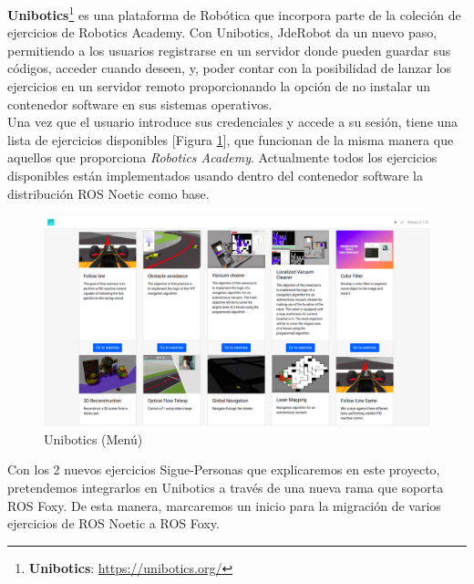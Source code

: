 \textbf{Unibotics}\footnote{\textbf{Unibotics}: \url{https://unibotics.org/}} es una plataforma de Robótica que incorpora parte de la coleción de ejercicios de Robotics Academy. Con Unibotics, JdeRobot da un nuevo paso, permitiendo a los usuarios registrarse en un servidor donde pueden guardar sus códigos, acceder cuando deseen, y, poder contar con la posibilidad de lanzar los ejercicios en un servidor remoto proporcionando la opción de no instalar un contenedor software en sus sistemas operativos.\\

Una vez que el usuario introduce sus credenciales y accede a su sesión, tiene una lista de ejercicios disponibles [Figura \ref{fig:menu-unibotics}], que funcionan de la misma manera que aquellos que proporciona \textit{Robotics Academy}. Actualmente todos los ejercicios disponibles están implementados usando dentro del contenedor software la distribución ROS Noetic como base.\\

\begin{figure} [H]
  \begin{center}
    \includegraphics[width=12cm]{imagenes/cap1/unibotics-menu.png}
  \end{center}
  \caption[Unibotics (Menú)]{Unibotics (Menú)}
  \label{fig:menu-unibotics}
\end{figure}

Con los 2 nuevos ejercicios Sigue-Personas que explicaremos en este proyecto, pretendemos integrarlos en Unibotics a través de una nueva rama que soporta ROS Foxy. De esta manera, marcaremos un inicio para la migración de varios ejercicios de ROS Noetic a ROS Foxy.\\




